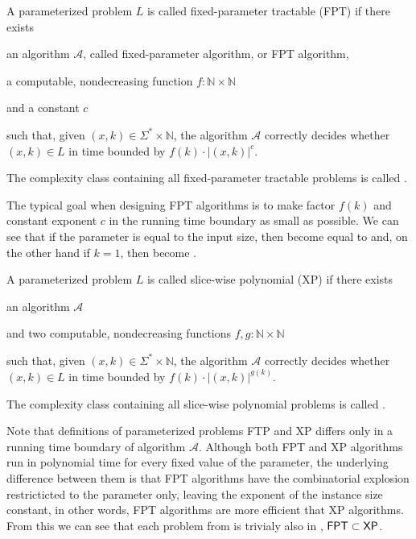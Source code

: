 \begin{definition}[FPT]
    A parameterized problem $L$ is called fixed-parameter tractable (FPT) if there exists
    \begin{description}
        \item an algorithm $\mathcal{A}$, called fixed-parameter algorithm, or FPT algorithm,
        \item a computable, nondecreasing function $f : \mathbb{N} \times \mathbb{N}$
        \item and a constant $c$
    \end{description}
    such that, given $(x,k) \in \Sigma^* \times \mathbb{N}$,
    the algorithm $\mathcal{A}$ correctly decides whether $(x, k) \in L$ in time bounded by
    $f(k) \cdot |(x,k)|^c$.
\end{definition}
The complexity class containing all fixed-parameter tractable problems is called \FPT.

The typical goal when designing FPT algorithms is to make factor $f(k)$ and constant exponent $c$
in the running time boundary as small as possible.
We can see that if the parameter is equal to the input size, then \FPT become equal to \NP and,
on the other hand if $k = 1$, then \FPT become \Po \cite{Koutensky2020}.

\begin{definition}[XP]
    A parameterized problem $L$ is called slice-wise polynomial (XP) if there exists
    \begin{description}
        \item an algorithm $\mathcal{A}$
        \item and two computable, nondecreasing functions $f,g : \mathbb{N} \times \mathbb{N}$
    \end{description}
    such that, given $(x,k) \in \Sigma^* \times \mathbb{N}$,
    the algorithm $\mathcal{A}$ correctly decides whether $(x, k) \in L$ in time bounded by
    $f(k) \cdot |(x,k)|^{g(k)}$.
\end{definition}
The complexity class containing all slice-wise polynomial problems is called \XP.

Note that definitions of parameterized problems FTP and XP differs only in a running time boundary of algorithm $\mathcal{A}$.
Although both FPT and XP algorithms run in polynomial time for every fixed value of the parameter,
the underlying difference between them is that FPT algorithms have the combinatorial explosion
restricticted to the parameter only, leaving the exponent of the instance size constant, in other words,
FPT algorithms are more efficient that XP algorithms.
From this we can see that each problem from \FPT is trivialy also in \XP, $\textsf{FPT} \subset \textsf{XP}$.

